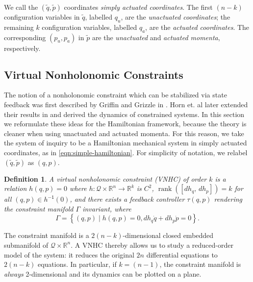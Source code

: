 \documentclass[journal,twoside,web]{ieeecolor}
\newtheorem{defn}[thm]{Definition} %
\DeclareMathOperator{\Rank}{rank}
\newcommand*{\rank}[1]{\Rank\left(#1\right)}
\newcommand*{\inv}{^\mathsf{-1}}
\newcommand*{\R}{\mathbb{R}}
\begin{document}
We call the \((\tilde{q},\tilde{p})\) coordinates
\textit{simply actuated coordinates}.
The first \((n-k)\) configuration variables in \(\tilde{q}\), labelled \(q_u\),
are the \textit{unactuated coordinates}; 
the remaining \(k\) configuration variables, labelled \(q_a\), are the
\textit{actuated coordinates}.
The corresponding \((p_u, p_a)\) in \(\tilde{p}\) are the \textit{unactuated}
and \textit{actuated momenta}, respectively.

\subsection{Virtual Nonholonomic Constraints}

The notion of a nonholonomic constraint which can be stabilized via state feedback
was first described by Griffin and Grizzle in \cite{nhvc_dynamic_walking}.
Horn et. al later extended their results in
\cite{hybrid_zero_dynamics_bipedal_nhvcs} and
derived the dynamics of constrained systems.
In this section we reformulate these ideas for the Hamiltonian framework,
because the theory is cleaner when using unactuated and actuated momenta.
For this reason, we take the system of inquiry to be a Hamiltonian
mechanical system in simply actuated coordinates, as in
\eqref{eqn:simple-hamiltonian}.
For simplicity of notation, we relabel \((\tilde{q},\tilde{p})\) as \((q,p)\).

\begin{defn}\label{defn:vnhc}
    A \textit{virtual nonholonomic constraint} (VNHC) \textit{of order \(k\)} is a
    relation \(h(q,p) = 0\) where \(h : \mathcal{Q}\times\R^n \rightarrow \R^k\) is
    \(C^2\), \(\rank{\left[ dh_q,\, dh_p \right]} = k\) for all 
    \((q,p) \in h\inv(0)\), and there exists a feedback controller \(\tau(q,p)\)
    rendering the \textit{constraint manifold} \(\Gamma\) invariant,
    where
    \begin{equation}
        \Gamma = \left\{(q,p) \mid h(q,p) = 0, dh_q \dot{q} + dh_p \dot{p} = 0\right\}
        .
    \end{equation}
\end{defn}

The constraint manifold is a \(2(n-k)\)-dimensional
closed embedded submanifold of \(\mathcal{Q} \times \R^n\).
A VNHC thereby allows us to study a reduced-order model of the system: it reduces
the original \(2n\) differential equations to \(2(n-k)\) equations.
In particular, if \(k = (n-1)\), the constraint manifold is \textit{always}
2-dimensional and its dynamics can be plotted on a plane. 
\end{document}

